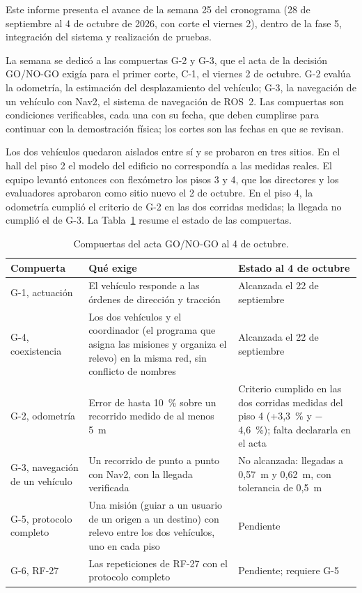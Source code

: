 \documentclass[12pt,letterpaper]{article}
\begin{document}
Este informe presenta el avance de la semana 25 del cronograma (28 de septiembre al 4 de octubre de 2026, con corte el viernes 2), dentro de la fase 5, integración del sistema y realización de pruebas.

La semana se dedicó a las compuertas G-2 y G-3, que el acta de la decisión GO/NO-GO exigía para el primer corte, C-1, el viernes 2 de octubre. G-2 evalúa la odometría, la estimación del desplazamiento del vehículo; G-3, la navegación de un vehículo con Nav2, el sistema de navegación de ROS~2. Las compuertas son condiciones verificables, cada una con su fecha, que deben cumplirse para continuar con la demostración física; los cortes son las fechas en que se revisan.

Los dos vehículos quedaron aislados entre sí y se probaron en tres sitios. En el hall del piso 2 el modelo del edificio no correspondía a las medidas reales. El equipo levantó entonces con flexómetro los pisos 3 y 4, que los directores y los evaluadores aprobaron como sitio nuevo el 2 de octubre. En el piso 4, la odometría cumplió el criterio de G-2 en las dos corridas medidas; la llegada no cumplió el de G-3. La Tabla~\ref{tab:compuertas} resume el estado de las compuertas.

\begin{table}[H]
    \centering
    \small
    \caption{Compuertas del acta GO/NO-GO al 4 de octubre.}
    \label{tab:compuertas}
    \begin{tabular}{@{}p{3.4cm}p{5.6cm}p{5.0cm}@{}}
        \toprule
        \textbf{Compuerta} & \textbf{Qué exige} & \textbf{Estado al 4 de octubre} \\ \midrule
        G-1, actuación & El vehículo responde a las órdenes de dirección y tracción & Alcanzada el 22 de septiembre \\ \addlinespace
        G-4, coexistencia & Los dos vehículos y el coordinador (el programa que asigna las misiones y organiza el relevo) en la misma red, sin conflicto de nombres & Alcanzada el 22 de septiembre \\ \addlinespace
        G-2, odometría & Error de hasta 10~\% sobre un recorrido medido de al menos 5~m & Criterio cumplido en las dos corridas medidas del piso 4 (+3,3~\% y $-$4,6~\%); falta declararla en el acta \\ \addlinespace
        G-3, navegación de un vehículo & Un recorrido de punto a punto con Nav2, con la llegada verificada & No alcanzada: llegadas a 0,57~m y 0,62~m, con tolerancia de 0,5~m \\ \addlinespace
        G-5, protocolo completo & Una misión (guiar a un usuario de un origen a un destino) con relevo entre los dos vehículos, uno en cada piso & Pendiente \\ \addlinespace
        G-6, RF-27 & Las repeticiones de RF-27 con el protocolo completo & Pendiente; requiere G-5 \\ \bottomrule
    \end{tabular}
\end{table}
\end{document}
